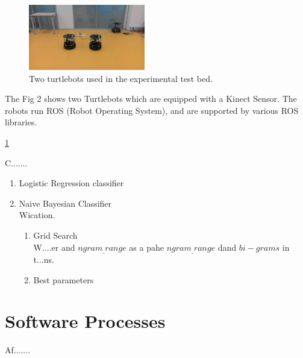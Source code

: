 \documentclass[journal]{IEEEtran}
\begin{document}
\begin{figure}[!h]
\begin{center}
\includegraphics[width=2in]{two.jpg}
\caption{Two turtlebots used in the experimental test bed.}
\end{center}
\label{fig2:mypicture2}
\end{figure}


The Fig 2 shows two Turtlebots which are equipped with a Kinect Sensor. The robots run ROS (Robot Operating System), and are supported by various ROS libraries. 

\ref{fig2:mypicture2}

C.......

\begin{enumerate}

\item Logistic Regression classifier


\item Naive Bayesian Classifier\\
Wication.

\begin{enumerate}
\item Grid Search\\
W....er and $ngram_{\_}range$ as a pahe $ngram_{\_}range$ dand $bi-grams$ in t...ns.
 




\item Best parameters


\end{enumerate}
\end{enumerate}






\section{Software Processes}

Af.......
\end{document}
